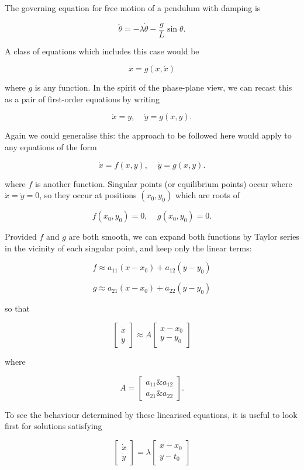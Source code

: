   The governing equation for free motion of a pendulum with damping is 

  $$\ddot{\theta} = -\lambda \dot{\theta} -\dfrac{g}{L} \sin \theta . \tag{1}$$ 

  A class of equations which includes this case would be 

  $$\ddot{x}=g(x,\dot{x}) \tag{2}$$ 

  where $g$ is any function. In the spirit of the phase-plane view, we can 
  recast this as a pair of first-order equations by writing 

  $$\dot{x} = y,\mathrm{~~~~~}\dot{y}=g(x,y). \tag{3}$$ 

  Again we could generalise this: the approach to be followed here would apply 
  to any equations of the form 

  $$\dot{x} = f(x,y),\mathrm{~~~~~}\dot{y}=g(x,y). \tag{4}$$ 

  where $f$ is another function. Singular points (or equilibrium points) occur 
  where $\dot{x}=\dot{y}=0$, so they occur at positions $(x_0,y_0)$ which are 
  roots of 

  $$f(x_0,y_0)=0, \mathrm{~~~~~}g(x_0,y_0)=0. \tag{5}$$ 

  Provided $f$ and $g$ are both smooth, we can expand both functions by Taylor 
  series in the vicinity of each singular point, and keep only the linear 
  terms: 

  $$f \approx a_{11} (x-x_0) + a_{12} (y-y_0)$$ 

  $$g \approx a_{21} (x-x_0) + a_{22} (y-y_0) \tag{6}$$ 

  so that 

  $$\begin{bmatrix}\dot{x}\\ \dot{y}\end{bmatrix} \approx A 
  \begin{bmatrix}x-x_0\\ y-y_0\end{bmatrix} \tag{7}$$ 

  where 

  $$A=\begin{bmatrix} a_{11} \& a_{12}\\a_{21} \& a_{22} \end{bmatrix} . 
  \tag{8}$$ 

  To see the behaviour determined by these linearised equations, it is useful 
  to look first for solutions satisfying 

  $$\begin{bmatrix} \dot{x} \\ \dot{y} \end{bmatrix} = \lambda \begin{bmatrix} 
  x-x_0 \\ y-t_0 \end{bmatrix} \tag{9}$$ 

